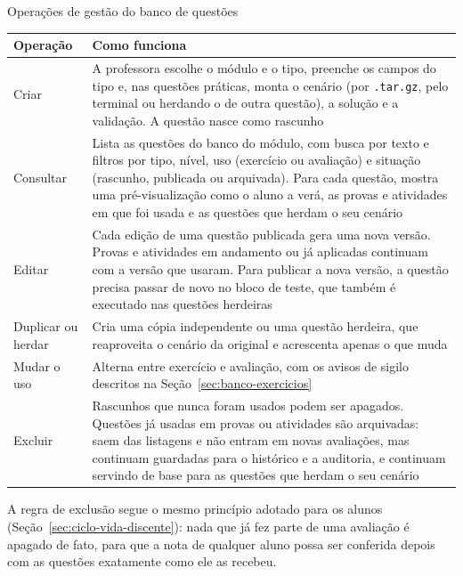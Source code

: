 \begin{quadro}[htbp]
    \caption{Operações de gestão do banco de questões}
    \label{qua:gestao-banco}
    \footnotesize
    \begin{tabularx}{\textwidth}{|>{\raggedright\arraybackslash}p{2.7cm}|L|}
        \hline
        \textbf{Operação} & \textbf{Como funciona} \\
        \hline
        Criar & A professora escolhe o módulo e o tipo, preenche os campos do tipo e, nas questões práticas, monta o cenário (por \texttt{.tar.gz}, pelo terminal ou herdando o de outra questão), a solução e a validação. A questão nasce como rascunho \\
        \hline
        Consultar & Lista as questões do banco do módulo, com busca por texto e filtros por tipo, nível, uso (exercício ou avaliação) e situação (rascunho, publicada ou arquivada). Para cada questão, mostra uma pré-visualização como o aluno a verá, as provas e atividades em que foi usada e as questões que herdam o seu cenário \\
        \hline
        Editar & Cada edição de uma questão publicada gera uma nova versão. Provas e atividades em andamento ou já aplicadas continuam com a versão que usaram. Para publicar a nova versão, a questão precisa passar de novo no bloco de teste, que também é executado nas questões herdeiras \\
        \hline
        Duplicar ou herdar & Cria uma cópia independente ou uma questão herdeira, que reaproveita o cenário da original e acrescenta apenas o que muda \\
        \hline
        Mudar o uso & Alterna entre exercício e avaliação, com os avisos de sigilo descritos na Seção~\ref{sec:banco-exercicios} \\
        \hline
        Excluir & Rascunhos que nunca foram usados podem ser apagados. Questões já usadas em provas ou atividades são arquivadas: saem das listagens e não entram em novas avaliações, mas continuam guardadas para o histórico e a auditoria, e continuam servindo de base para as questões que herdam o seu cenário \\
        \hline
    \end{tabularx}
\end{quadro}

A regra de exclusão segue o mesmo princípio adotado para os alunos (Seção~\ref{sec:ciclo-vida-discente}): nada que já fez parte de uma avaliação é apagado de fato, para que a nota de qualquer aluno possa ser conferida depois com as questões exatamente como ele as recebeu.

